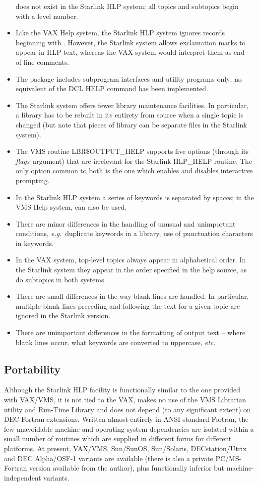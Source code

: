 \begin{itemize}
does not exist in the Starlink HLP system;  all topics and subtopics
begin with a level number.
\item Like the VAX Help system, the Starlink HLP system ignores
records beginning with \fstring{!}.  However, the Starlink
system allows exclamation marks to appear in HLP text, whereas
the VAX system would interpret them as end-of-line comments.
\item The package includes subprogram interfaces and utility
programs only;  no equivalent of the DCL HELP command
has been implemented.
\item The Starlink system offers fewer library maintenance facilities.
In particular, a library has to be rebuilt in its entirety from source
when a single topic is changed (but note that pieces of library
can be separate files in the Starlink system).
\item The VMS routine LBR\$OUTPUT\_HELP supports five options
(through its {\it flags}\, argument) that are irrelevant for the
Starlink HLP\_HELP routine.  The only option common to both is
the one which enables and disables interactive prompting.
\item In the Starlink HLP system a series of keywords is
separated by spaces;  in the VMS Help system, \fstring{/} can also
be used.
\item There are minor differences in the handling of unusual
and unimportant conditions, {\it e.g.}\ duplicate keywords in
a library, use of punctuation characters in keywords.
\item In the VAX system, top-level topics always appear in
alphabetical order.  In the Starlink system they appear in the order
specified in the help source, as do subtopics in both systems.
\item There are small differences in the way blank lines
are handled.  In particular, multiple
blank lines preceding and following
the text for a given topic are ignored in the Starlink version.
\item There are unimportant differences in the formatting of
output text -- where blank lines occur, what keywords are
converted to uppercase, {\it etc}.
\end{itemize}

\subsection{Portability}
Although the Starlink HLP facility is
functionally similar to the one provided
with VAX/VMS, it is not tied to the VAX, makes no use of the VMS
Librarian utility and Run-Time Library and does not depend (to any
significant extent) on DEC Fortran extensions.  Written almost entirely
in ANSI-standard Fortran, the few unavoidable machine and operating
system dependencies are isolated within a small number of routines which
are supplied in different forms for different platforms.  At present,
VAX/VMS, Sun/SunOS, Sun/Solaris, DECstation/Utrix and DEC Alpha/OSF-1
variants are available (there is also a private PC/MS-Fortran version
available from the author), plus
functionally inferior but machine-independent variants.

